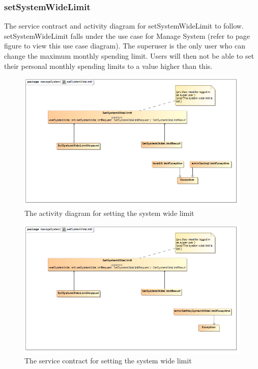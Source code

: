 \documentclass[a4paper,12pt]{report}
\begin{document}
\subsubsection{setSystemWideLimit}
The service contract and activity diagram for setSystemWideLimit to follow. setSystemWideLimit falls under the use case for Manage System (refer to page   figure   to view this use case diagram). The superuser is the only user who can change the maximum monthly spending limit. Users will then not be able to set their personal monthly spending limits to a value higher than this.
\begin{figure}[H]
  \centering
    \includegraphics[width=1.0\textwidth]{../images/setSystemWideLimit.png}
    \caption{The activity diagram for setting the system wide limit} 
\end{figure}

\begin{figure}[H]
	\centering
	\includegraphics[width=1.0\textwidth]{../images/setSystemWideLimitServiceContract.png}
	\caption{The service contract for setting the system wide limit}
\end{figure}
\end{document}
